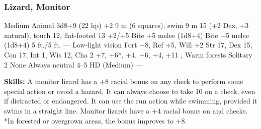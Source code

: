 \subsubsection{Lizard, Monitor}
\begin{MonsterStats}
{Medium Animal}
{3d8+9 (22 hp)}
{+2}
{9 m (6 squares), swim 9 m}
{15 (+2 Dex, +3 natural), touch 12, flat-footed 13}
{+2/+5}
{Bite +5 melee (1d8+4)}
{Bite +5 melee (1d8+4)}
{5 ft./5 ft.}
{—}
{Low-light vision}
{Fort +8, Ref +5, Will +2}
{Str 17, Dex 15, Con 17, Int 1, Wis 12, Cha 2}
{ +7,  +6*,  +4,  +6,  +4,  +11}
{, }
{Warm forests}
{Solitary}
{2}
{None}
{Always neutral}
{4--5 HD (Medium)}
{---}
\end{MonsterStats}

\textbf{Skills:} A monitor lizard has a +8 racial bonus on any  check to perform some special action or avoid a hazard. It can always choose to take 10 on a  check, even if distracted or endangered. It can use the run action while swimming, provided it swims in a straight line. Monitor lizards have a +4 racial bonus on  and  checks. *In forested or overgrown areas, the  bonus improves to +8.

